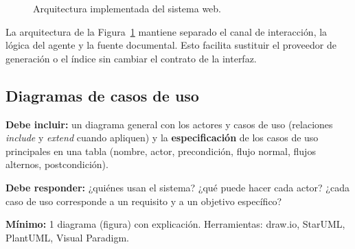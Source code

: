 \begin{figure}[H]
\centering
{}
\caption{Arquitectura implementada del sistema web.}
\label{fig:arquitectura_desarrollo}
\end{figure}

La arquitectura de la Figura~\ref{fig:arquitectura_desarrollo} mantiene separado el canal de interacción, la lógica del
agente y la fuente documental. Esto facilita sustituir el proveedor de generación o el índice sin cambiar el contrato de
la interfaz.

\subsection{Diagramas de casos de uso} \label{sec:casos_uso} %

\begin{guia}
\textbf{Debe incluir:} un diagrama general con los actores y casos de uso (relaciones \emph{include} y \emph{extend} cuando
apliquen) y la \textbf{especificación} de los casos de uso principales en una tabla (nombre, actor, precondición, flujo
normal, flujos alternos, postcondición).

\textbf{Debe responder:} ¿quiénes usan el sistema? ¿qué puede hacer cada actor? ¿cada caso de uso corresponde a un
requisito y a un objetivo específico?

\textbf{Mínimo:} 1 diagrama (figura) con explicación. Herramientas: draw.io, StarUML, PlantUML, Visual Paradigm.
\end{guia}

